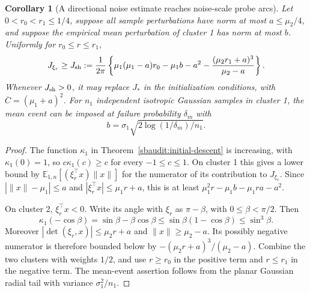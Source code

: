 \documentclass[10pt]{article}
\newtheorem{corollary}[theorem]{Corollary}
\theoremstyle{remark}\newtheorem{remark}[theorem]{Remark}
\begin{document}
\begin{corollary}[A directional noise estimate reaches noise-scale probe arcs]
\label{sbaudit:sharp-noise}
Let $0<r_0<r_1\le1/4$, suppose all sample perturbations have norm at most
$a\le\mu_2/4$, and suppose the empirical mean perturbation of cluster 1
has norm at most $b$. Uniformly for $r_0\le r\le r_1$,
\begin{equation}\label{sbaudit:sharp-J}
 J_{\xi_r}\ge J_{\rm sh}:=\frac1{2\pi}
 \left\{\mu_1(\mu_1-a)r_0-\mu_1b-a^2
              -\frac{(\mu_2r_1+a)^3}{\mu_2-a}\right\}.
\end{equation}
Whenever $J_{\rm sh}>0$, it may replace $J_*$ in the initialization
conditions, with $\overline C=(\mu_1+a)^2$.
For $n_1$ independent isotropic Gaussian samples in cluster 1, the mean
event can be imposed at failure probability $\delta_m$ with
\[
 b=\sigma_1\sqrt{2\log(1/\delta_m)/n_1}.
\]
\end{corollary}
\begin{proof}
The function $\kappa_1$ in Theorem~\ref{sbaudit:initial-descent} is increasing,
with $\kappa_1(0)=1$, so $c\kappa_1(c)\ge c$ for every
$-1\le c\le1$.
On cluster 1 this gives a lower bound by
$\mathbb E_{1,n}[(\xi_r^\top x)\|x\|]$ for the numerator of its
contribution to $J_{\xi_r}$. Since
$|\|x\|-\mu_1|\le a$ and $|\xi_r^\top x|\le\mu_1r+a$,
this is at least
$\mu_1^2r-\mu_1b-\mu_1ra-a^2$.

On cluster 2, $\xi_r^\top x<0$. Write its angle with $\xi_r$ as
$\pi-\beta$, with $0\le\beta<\pi/2$. Then
\[
 \kappa_1(-\cos\beta)=\sin\beta-\beta\cos\beta
 \le\sin\beta(1-\cos\beta)\le\sin^3\beta.
\]
Moreover $|\det(\xi_r,x)|\le\mu_2r+a$ and $\|x\|\ge\mu_2-a$.
Its possibly negative numerator is therefore bounded below by
$-(\mu_2r+a)^3/(\mu_2-a)$. Combine the two clusters with weights
$1/2$, and use $r\ge r_0$ in the positive term and $r\le r_1$ in the
negative term. The mean-event assertion follows from the planar
Gaussian radial tail with variance $\sigma_1^2/n_1$.
\end{proof}
\end{document}
